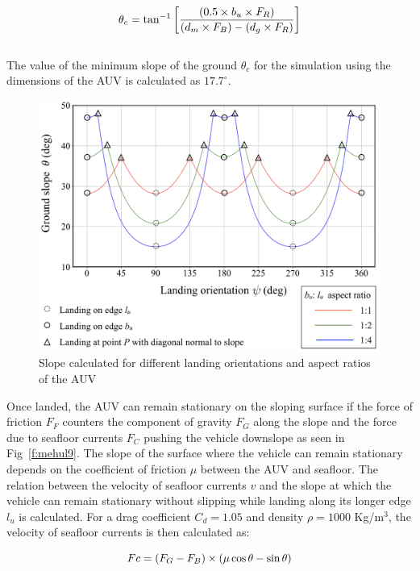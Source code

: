 \begin{equation}
\label{eq:eq2}
\centering
	\theta_c = \tan^{-1}\left[ \frac{(0.5 \times b_u \times F_R)}{(d_m \times F_B) - (d_g \times F_R)}\right]
\end{equation}\\


The value of the minimum slope of the ground $\theta_c$ for the simulation using the dimensions of the AUV is calculated as $17.7^\circ$.

\begin{figure}[!ht]
\centering
\includegraphics[width=6in]{./images/mehul8.png}
\caption{Slope calculated for different landing orientations and aspect ratios of the AUV}
\label{f:mehul8}
\end{figure}

Once landed, the AUV can remain stationary on the sloping surface if the force of friction $F_F$ counters the component of gravity $F_G$ along the slope and the force due to seafloor currents $F_C$ pushing the vehicle downslope as seen in Fig~\ref{f:mehul9}. The slope of the surface where the vehicle can remain stationary depends on the coefficient of friction $\mu$ between the AUV and seafloor. The relation between the velocity of seafloor currents $v$ and the slope at which the vehicle can remain stationary without slipping  while landing along its longer edge $l_u$ is calculated. For a drag coefficient $C_d = 1.05$ and density $\rho= 1000$ Kg/m$^3$, the velocity of seafloor currents is then calculated as:

\begin{equation}
\label{eq:eq3}
\centering
	Fc = (F_G - F_B) \times (\mu \cos\theta - \sin\theta)
\end{equation}

